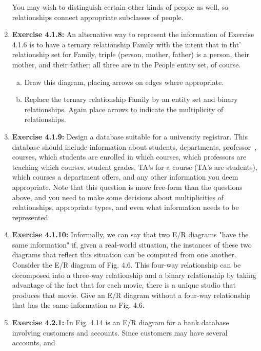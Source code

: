 \documentclass[12pt]{article}
\begin{document}
\begin{enumerate}[1.]
    You may wish to distinguish certain other kinds of people as well, so relationships connect appropriate subclasses of people.


    \item \textbf{Exercise 4.1.8:} An alternative way to represent the information of Exercise
    4.1.6 is to have a ternary relationship Family with the intent that in tht'
    relationship set for Family, triple (person, mother, father) is a person, their
    mother, and their father; all three are in the People entity set, of course.

    \bigskip

    \begin{enumerate}[a)]
        \item Draw this diagram, placing arrows on edges where appropriate.
        \item Replace the ternary relationship Family by an entity set and binary relationships. Again place arrows to indicate the multiplicity of relationships.
    \end{enumerate}

    \item \textbf{Exercise 4.1.9:} Design a database suitable for a university registrar. This
    database should include information about students, departments, professor~,
    courses, which students are enrolled in which courses, which professors are
    teaching which courses, student grades, TA's for a course (TA's are students),
    which courses a department offers, and any other information you deem appropriate.
    Note that this question is more free-form than the questions above, and
    you need to make some decisions about multiplicities of relationships, appropriate
    types, and even what information needs to be represented.

    \item \textbf{Exercise 4.1.10:} Informally, we can say that two E/R diagrams "have the
    same information" if, given a real-world situation, the instances of these two diagrams
    that reflect this situation can be computed from one another. Consider
    the E/R diagram of Fig. 4.6. This four-way relationship can be decomposed
    into a three-way relationship and a binary relationship by taking advantage
    of the fact that for each movie, there is a unique studio that produces that
    movie. Give an E/R diagram without a four-way relationship that has the
    same information as Fig. 4.6.

    \item \textbf{Exercise 4.2.1:} In Fig. 4.14 is an E/R diagram for a bank database involving
    customers and accounts. Since customers may have several accounts, and



\end{enumerate}
\end{document}
